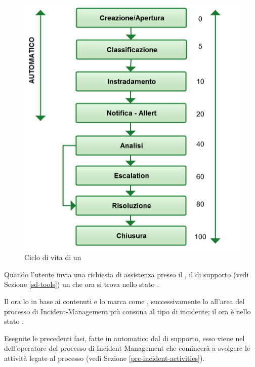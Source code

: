 \begin{figure}[htbp]
\centering
\includegraphics[scale=0.4]{Images/Diagrams/Ticket_life_cycle.png}
\caption{Ciclo di vita di un }
\label{prc-incident-status}
\end{figure}

Quando l'utente invia una richiesta di assistenza presso il , il  di supporto (vedi Sezione \ref{sd-tools})  un  che ora si trova nello stato .

Il  ora lo  in base ai contenuti e lo marca come , successivamente lo  all'area del processo di \ac{Incident-Management} più consona al tipo di incidente; il  ora è nello stato .

Eseguite le precedenti fasi, fatte in automatico dal  di supporto, esso viene  nel  dell'operatore del processo di \ac{Incident-Management} che comincerà a svolgere le attività legate al processo (vedi Sezione \ref{prc-incident-activities}).

